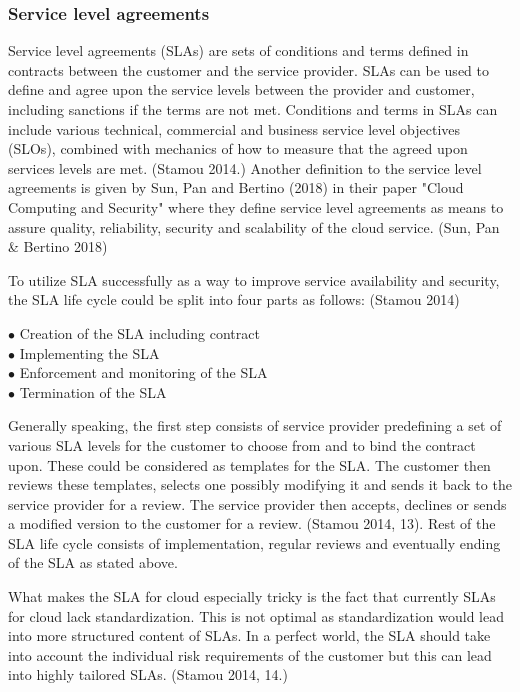 \documentclass{article}
\begin{document}
\subsubsection{Service level agreements}
Service level agreements (SLAs) are sets of conditions and terms defined in contracts between the customer and the service provider. SLAs can be used to define and agree upon the service levels between the provider and customer, including sanctions if the terms are not met. Conditions and terms in SLAs can include various technical, commercial and business service level objectives (SLOs), combined with mechanics of how to measure that the agreed upon services levels are met. (Stamou 2014.) Another definition to the service level agreements is given by Sun, Pan and Bertino (2018) in their paper "Cloud Computing and Security" where they define service level agreements as means to assure quality, reliability, security and scalability of the cloud service. (Sun, Pan \& Bertino 2018) 
\par
To utilize SLA successfully as a way to improve service availability and security, the SLA life cycle could be split into four parts as follows: (Stamou 2014)
\begin{description}
        \item[$\bullet$ Creation of the SLA including contract]
        \item[$\bullet$ Implementing the SLA]
        \item[$\bullet$ Enforcement and monitoring of the SLA]
        \item[$\bullet$ Termination of the SLA]
\end{description}
Generally speaking, the first step consists of service provider predefining a set of various SLA levels for the customer to choose from and to bind the contract upon. These could be considered as templates for the SLA. The customer then reviews these templates, selects one possibly modifying it and sends it back to the service provider for a review. The service provider then accepts, declines or sends a modified version to the customer for a review. (Stamou 2014, 13). Rest of the SLA life cycle consists of implementation, regular reviews and eventually ending of the SLA as stated above.
\par
What makes the SLA for cloud especially tricky is the fact that currently SLAs for cloud lack standardization. This is not optimal as standardization would lead into more structured content of SLAs. In a perfect world, the SLA should take into account the individual risk requirements of the customer but this can lead into highly tailored SLAs. (Stamou 2014, 14.)
\end{document}
